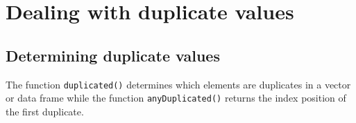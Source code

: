 \documentclass[
]{book}
\begin{document}
\hypertarget{dealing-with-duplicate-values}{%
\section{Dealing with duplicate values}\label{dealing-with-duplicate-values}}

\hypertarget{determining-duplicate-values}{%
\subsection{Determining duplicate values}\label{determining-duplicate-values}}

The function \texttt{duplicated()} determines which elements are duplicates in a vector or data frame while the function \texttt{anyDuplicated()} returns the index position of the first duplicate.
\end{document}
